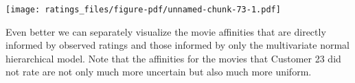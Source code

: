 \documentclass[
  letterpaper,
  DIV=11,
  numbers=noendperiod]{scrartcl}
\newenvironment{Shaded}{\begin{snugshade}}{\end{snugshade}}
\newcommand{\AttributeTok}[1]{\textcolor[rgb]{0.40,0.45,0.13}{#1}}
\newcommand{\ControlFlowTok}[1]{\textcolor[rgb]{0.00,0.23,0.31}{#1}}
\newcommand{\DecValTok}[1]{\textcolor[rgb]{0.68,0.00,0.00}{#1}}
\newcommand{\FunctionTok}[1]{\textcolor[rgb]{0.28,0.35,0.67}{#1}}
\newcommand{\NormalTok}[1]{\textcolor[rgb]{0.00,0.23,0.31}{#1}}
\newcommand{\OtherTok}[1]{\textcolor[rgb]{0.00,0.23,0.31}{#1}}
\newcommand{\SpecialCharTok}[1]{\textcolor[rgb]{0.37,0.37,0.37}{#1}}
\newcommand{\StringTok}[1]{\textcolor[rgb]{0.13,0.47,0.30}{#1}}
\begin{document}
\begin{Shaded}
\end{Shaded}

\texttt{[image: ratings\_files/figure-pdf/unnamed-chunk-73-1.pdf]}

Even better we can separately visualize the movie affinities that are
directly informed by observed ratings and those informed by only the
multivariate normal hierarchical model. Note that the affinities for the
movies that Customer 23 did not rate are not only much more uncertain
but also much more uniform.
\end{document}

